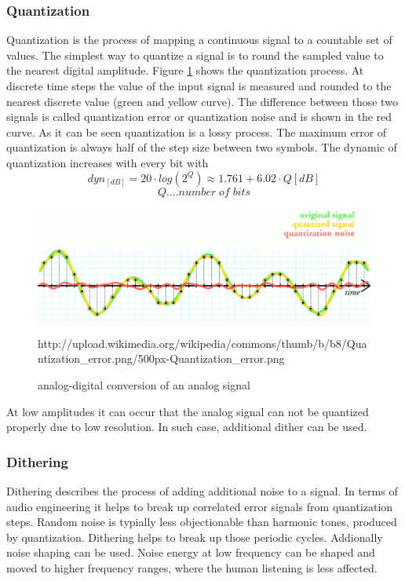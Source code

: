 \documentclass[11pt]{report}
\begin{document}
\subsubsection{Quantization}
Quantization is the process of mapping a continuous signal to a countable set of values. The simplest way to quantize a signal is to round the sampled value to the nearest digital amplitude. Figure \ref{fig:quantization}  shows the quantization process. At discrete time steps the value of the input signal is measured and rounded to the nearest discrete value (green and yellow curve). The difference between those two signals is called quantization error or quantization noise and is shown in the red curve. As it can be seen quantization is a lossy process. The maximum error of quantization is always half of the step size between two symbols. The dynamic of quantization increases with every bit with
\begin{equation}
dyn_{[dB]}=20\cdot log(2^Q) \approx 1.761 + 6.02\cdot Q [dB]
\end{equation}
$$Q....number\; of\; bits$$
\begin{figure}[htbp]
\begin{center}
\includegraphics[width=14cm,keepaspectratio=true]{quantization}
\caption{analog-digital conversion of an analog signal}
\label{fig:quantization}
\end{center}
http://upload.wikimedia.org/wikipedia/commons/thumb/b/b8/Quantization\_error.png/500px-Quantization\_error.png
\end{figure}
At low amplitudes it can occur that the analog signal can not be quantized properly due to low resolution. In such case, additional dither can be used.
\subsubsection{Dithering}
Dithering describes the process of adding additional noise to a signal. In terms of audio engineering it helps to break up correlated error signals from quantization steps. Random noise is typially less objectionable than harmonic tones, produced by quantization. Dithering helps to break up those periodic cycles. Addionally noise shaping can be used. Noise energy at low frequency can be shaped and moved to higher frequency ranges, where the human listening is less affected.
\end{document}
